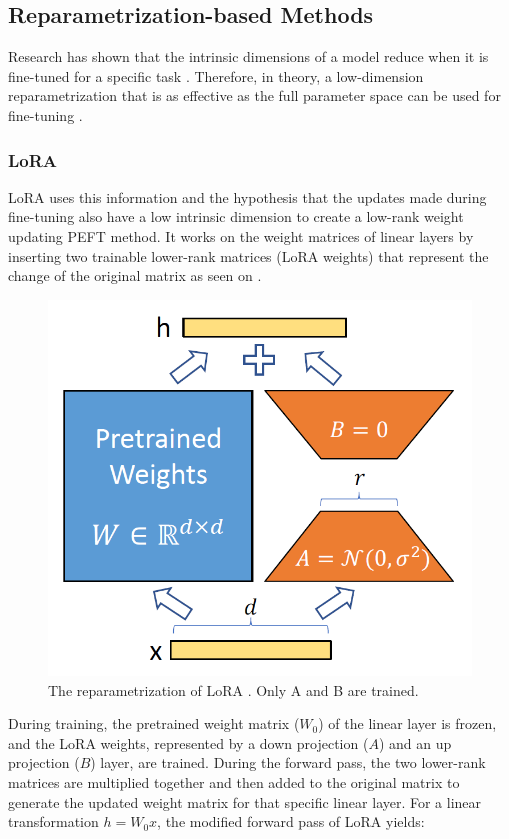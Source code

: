 \subsection{Reparametrization-based Methods}
Research has shown that the intrinsic dimensions of a model reduce when it is fine-tuned for a specific task \cite{aghajanyan2020intrinsic}. Therefore, in theory, a low-dimension reparametrization that is as effective as the full parameter space can be used for fine-tuning \cite{aghajanyan2020intrinsic}.

\subsubsection{LoRA}
LoRA \cite{hu2021lora} uses this information and the hypothesis that the updates made during fine-tuning also have a low intrinsic dimension to create a low-rank weight updating PEFT method. It works on the weight matrices of linear layers by inserting two trainable lower-rank matrices (LoRA weights) that represent the change of the original matrix as seen on .

\begin{figure}[h]
    \centering
    \includegraphics[width=0.6\linewidth]{assets/images/lora-reparametrization.png}
    \caption{The reparametrization of LoRA \cite{hu2021lora}. Only A and B are trained.}
    \label{lora-reparam}
\end{figure}

During training, the pretrained weight matrix (\(W_0\)) of the linear layer is frozen, and the LoRA weights, represented by a down projection (\(A\)) and an up projection (\(B\)) layer, are trained. During the forward pass, the two lower-rank matrices are multiplied together and then added to the original matrix to generate the updated weight matrix for that specific linear layer. For a linear transformation \(h = W_0 x\), the modified forward pass of LoRA yields:


